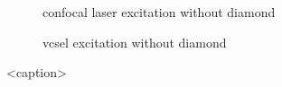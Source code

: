 	\begin{figure}[tp]
		\begin{subfigure}[t]{ 0.49\linewidth}
			\centering
			\caption{confocal laser excitation without diamond}
			\label{subfig::confocal_laser_excitation_without_diamond}
		\end{subfigure}
		\hfill
		\begin{subfigure}[t]{ 0.49\linewidth}
			\centering
			\caption{vcsel excitation without diamond}
			\label{subfig::vcsel_excitation_without_diamond}
		\end{subfigure}
		\caption{<caption>}
	\end{figure}

